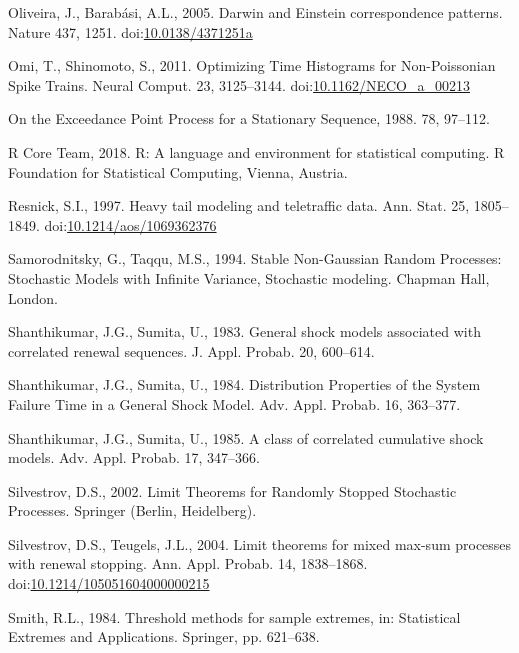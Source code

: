 \documentclass[]{elsarticle} %
\begin{document}
\leavevmode\hypertarget{ref-Oliveira2005}{}%
Oliveira, J., Barabási, A.L., 2005. Darwin and Einstein correspondence
patterns. Nature 437, 1251.
doi:\href{https://doi.org/10.0138/4371251a}{10.0138/4371251a}

\leavevmode\hypertarget{ref-Omi2011}{}%
Omi, T., Shinomoto, S., 2011. Optimizing Time Histograms for
Non-Poissonian Spike Trains. Neural Comput. 23, 3125--3144.
doi:\href{https://doi.org/10.1162/NECO_a_00213}{10.1162/NECO\_a\_00213}

\leavevmode\hypertarget{ref-Hsing88}{}%
On the Exceedance Point Process for a Stationary Sequence, 1988. 78,
97--112.

\leavevmode\hypertarget{ref-R}{}%
R Core Team, 2018. R: A language and environment for statistical
computing. R Foundation for Statistical Computing, Vienna, Austria.

\leavevmode\hypertarget{ref-Resnick97}{}%
Resnick, S.I., 1997. Heavy tail modeling and teletraffic data. Ann.
Stat. 25, 1805--1849.
doi:\href{https://doi.org/10.1214/aos/1069362376}{10.1214/aos/1069362376}

\leavevmode\hypertarget{ref-SamorodnitskyTaqqu}{}%
Samorodnitsky, G., Taqqu, M.S., 1994. Stable Non-Gaussian Random
Processes: Stochastic Models with Infinite Variance, Stochastic
modeling. Chapman Hall, London.

\leavevmode\hypertarget{ref-Sumita1983}{}%
Shanthikumar, J.G., Sumita, U., 1983. General shock models associated
with correlated renewal sequences. J. Appl. Probab. 20, 600--614.

\leavevmode\hypertarget{ref-Sumita1984}{}%
Shanthikumar, J.G., Sumita, U., 1984. Distribution Properties of the
System Failure Time in a General Shock Model. Adv. Appl. Probab. 16,
363--377.

\leavevmode\hypertarget{ref-Sumita1985}{}%
Shanthikumar, J.G., Sumita, U., 1985. A class of correlated cumulative
shock models. Adv. Appl. Probab. 17, 347--366.

\leavevmode\hypertarget{ref-Silvestrov2002a}{}%
Silvestrov, D.S., 2002. Limit Theorems for Randomly Stopped Stochastic
Processes. Springer (Berlin, Heidelberg).

\leavevmode\hypertarget{ref-ST04}{}%
Silvestrov, D.S., Teugels, J.L., 2004. Limit theorems for mixed max-sum
processes with renewal stopping. Ann. Appl. Probab. 14, 1838--1868.
doi:\href{https://doi.org/10.1214/105051604000000215}{10.1214/105051604000000215}

\leavevmode\hypertarget{ref-smith1984threshold}{}%
Smith, R.L., 1984. Threshold methods for sample extremes, in:
Statistical Extremes and Applications. Springer, pp. 621--638.
\end{document}
